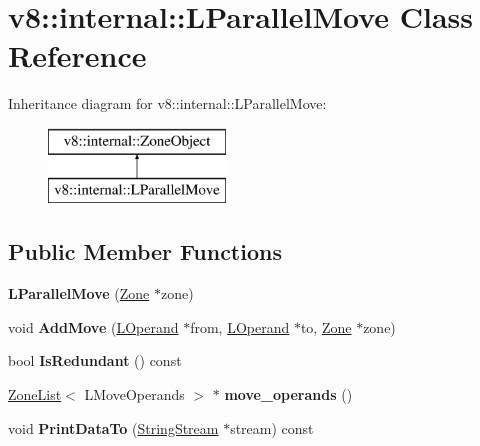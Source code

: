 \hypertarget{classv8_1_1internal_1_1_l_parallel_move}{}\section{v8\+:\+:internal\+:\+:L\+Parallel\+Move Class Reference}
\label{classv8_1_1internal_1_1_l_parallel_move}
Inheritance diagram for v8\+:\+:internal\+:\+:L\+Parallel\+Move\+:\begin{figure}[H]
\begin{center}
\leavevmode
\includegraphics[height=2.000000cm]{classv8_1_1internal_1_1_l_parallel_move}
\end{center}
\end{figure}
\subsection*{Public Member Functions}
\begin{DoxyCompactItemize}
\item 
{\bfseries L\+Parallel\+Move} (\hyperlink{classv8_1_1internal_1_1_zone}{Zone} $\ast$zone)\hypertarget{classv8_1_1internal_1_1_l_parallel_move_addc0669158ce843da1ad48ba13b09f08}{}\label{classv8_1_1internal_1_1_l_parallel_move_addc0669158ce843da1ad48ba13b09f08}

\item 
void {\bfseries Add\+Move} (\hyperlink{classv8_1_1internal_1_1_l_operand}{L\+Operand} $\ast$from, \hyperlink{classv8_1_1internal_1_1_l_operand}{L\+Operand} $\ast$to, \hyperlink{classv8_1_1internal_1_1_zone}{Zone} $\ast$zone)\hypertarget{classv8_1_1internal_1_1_l_parallel_move_a22dd724adf70aa7f2fd605890c0a44a0}{}\label{classv8_1_1internal_1_1_l_parallel_move_a22dd724adf70aa7f2fd605890c0a44a0}

\item 
bool {\bfseries Is\+Redundant} () const \hypertarget{classv8_1_1internal_1_1_l_parallel_move_a09a248131362b56253fc5d2dc5606002}{}\label{classv8_1_1internal_1_1_l_parallel_move_a09a248131362b56253fc5d2dc5606002}

\item 
\hyperlink{classv8_1_1internal_1_1_zone_list}{Zone\+List}$<$ L\+Move\+Operands $>$ $\ast$ {\bfseries move\+\_\+operands} ()\hypertarget{classv8_1_1internal_1_1_l_parallel_move_a9f3a17065ace9fa47d7df0d0f29b3e0c}{}\label{classv8_1_1internal_1_1_l_parallel_move_a9f3a17065ace9fa47d7df0d0f29b3e0c}

\item 
void {\bfseries Print\+Data\+To} (\hyperlink{classv8_1_1internal_1_1_string_stream}{String\+Stream} $\ast$stream) const \hypertarget{classv8_1_1internal_1_1_l_parallel_move_a43341b3da02f6abb6c4b1e3366e94c19}{}\label{classv8_1_1internal_1_1_l_parallel_move_a43341b3da02f6abb6c4b1e3366e94c19}

\end{DoxyCompactItemize}
